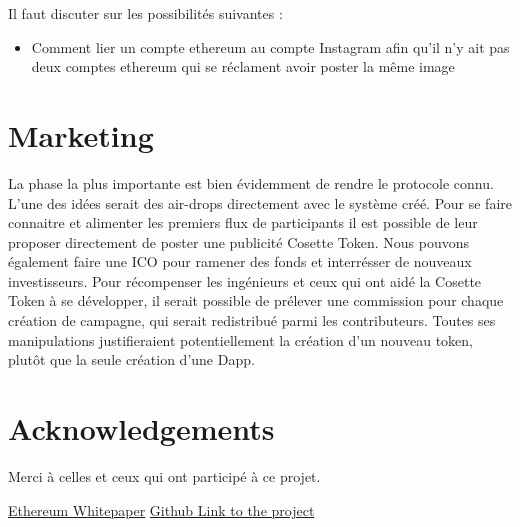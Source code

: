\documentclass[10pt]{article}
\begin{document}
Il faut discuter sur les possibilités suivantes :
\begin{itemize}
  \item Comment lier un compte ethereum au compte Instagram afin qu'il n'y ait pas deux comptes ethereum qui se réclament avoir poster la même image
\end{itemize}

\section{Marketing}
La phase la plus importante est bien évidemment de rendre le protocole connu. L'une des idées serait des air-drops directement avec le système créé. Pour se faire connaitre et alimenter les premiers flux de participants il est possible de leur proposer directement de poster une publicité Cosette Token.  
Nous pouvons également faire une ICO pour ramener des fonds et interrésser de nouveaux investisseurs.  
Pour récompenser les ingénieurs et ceux qui ont aidé la Cosette Token à se développer, il serait possible de prélever une commission pour chaque création de campagne, qui serait redistribué parmi les contributeurs.  
Toutes ses manipulations justifieraient potentiellement la création d'un nouveau token, plutôt que la seule création d'une Dapp.


\section*{Acknowledgements}
Merci à celles et ceux qui ont participé à ce projet.

\begin{thebibliography}{99}

\bibitem{} \href{https://ethereum.org/en/whitepaper/}{Ethereum Whitepaper}
\bibitem{} \href{https://github.com/tttienthinh/Cosette}{Github Link to the project}


\end{thebibliography}

\end{document}
